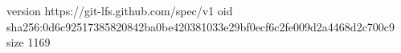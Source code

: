 version https://git-lfs.github.com/spec/v1
oid sha256:0d6c92517385820842ba0be420381033e29bf0ecf6c2fe009d2a4468d2c700c9
size 1169
